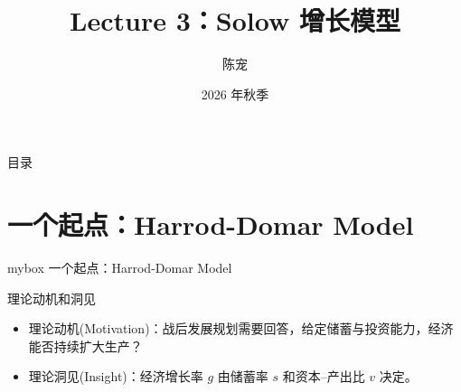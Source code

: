 \documentclass[aspectratio=32]{beamer}
\title[Lecture 3: Solow Model]{Lecture 3：Solow 增长模型}
\author{陈宠\inst{1}}
\institute{中国人民大学经济学院\inst{1}}
\date{2026 年秋季}
\begin{document}
\begin{frame}
\maketitle
\end{frame}

\begin{frame}{目录}
\tableofcontents[hideallsubsections]
\end{frame}

\section{一个起点：Harrod-Domar Model}
\begin{frame}
\begin{center}
    \begin{minipage}{1\textwidth}
		\begin{beamercolorbox}[wd=0.7\textwidth, rounded=true, shadow=true]{mybox}
			\LARGE \centering 一个起点：Harrod-Domar Model
		\end{beamercolorbox}
    \end{minipage}
\end{center} 
\end{frame}

\begin{frame}{理论动机和洞见}
\begin{itemize}
  \item 理论动机(Motivation)：战后发展规划需要回答，给定储蓄与投资能力，经济能否持续扩大生产？
  \item 理论洞见(Insight)：经济增长率 $g$ 由储蓄率 $s$ 和资本--产出比 $v$ 决定。
\end{itemize}
\end{frame}
\end{document}
